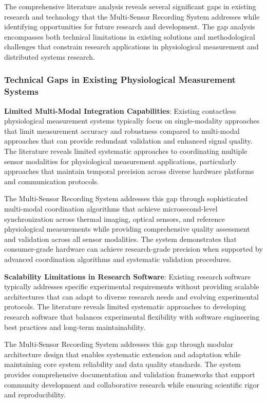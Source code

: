 \documentclass[11pt,a4paper]{article}
\begin{document}
The comprehensive literature analysis reveals several significant gaps in existing research and technology that the
Multi-Sensor Recording System addresses while identifying opportunities for future research and development. The gap
analysis encompasses both technical limitations in existing solutions and methodological challenges that constrain
research applications in physiological measurement and distributed systems research.

\subsubsection{Technical Gaps in Existing Physiological Measurement Systems}

\textbf{Limited Multi-Modal Integration Capabilities}: Existing contactless physiological measurement systems typically focus
on single-modality approaches that limit measurement accuracy and robustness compared to multi-modal approaches that can
provide redundant validation and enhanced signal quality. The literature reveals limited systematic approaches to
coordinating multiple sensor modalities for physiological measurement applications, particularly approaches that
maintain temporal precision across diverse hardware platforms and communication protocols.

The Multi-Sensor Recording System addresses this gap through sophisticated multi-modal coordination algorithms that
achieve microsecond-level synchronization across thermal imaging, optical sensors, and reference physiological
measurements while providing comprehensive quality assessment and validation across all sensor modalities. The system
demonstrates that consumer-grade hardware can achieve research-grade precision when supported by advanced coordination
algorithms and systematic validation procedures.

\textbf{Scalability Limitations in Research Software}: Existing research software typically addresses specific experimental
requirements without providing scalable architectures that can adapt to diverse research needs and evolving experimental
protocols. The literature reveals limited systematic approaches to developing research software that balances
experimental flexibility with software engineering best practices and long-term maintainability.

The Multi-Sensor Recording System addresses this gap through modular architecture design that enables systematic
extension and adaptation while maintaining core system reliability and data quality standards. The system provides
comprehensive documentation and validation frameworks that support community development and collaborative research
while ensuring scientific rigor and reproducibility.
\end{document}
